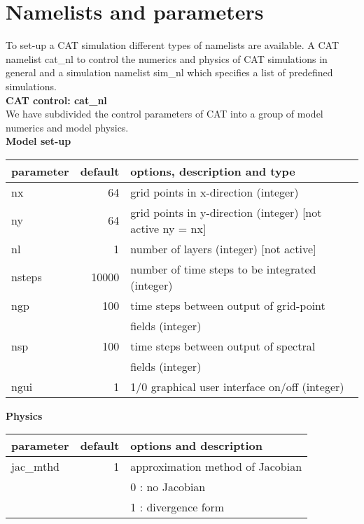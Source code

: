 \chapter{Namelists and parameters}
To set-up a CAT simulation different types of namelists are available. 
A CAT namelist cat{\_}nl to control the numerics and physics of CAT
simulations in general and a simulation namelist sim{\_}nl which specifies 
a list of predefined simulations.\\ 

\noindent
{\bf \Large CAT control: cat{\_}nl} \\
\noindent
We have subdivided the control parameters of CAT into a group of model
numerics and model physics. \\

\noindent
{\bf Model set-up} \\ 
\noindent
\begin{tabular}{|l|r|l|}
 \hline
 parameter & default & options, description and type \\
 \hline
 nx      &   64       & grid points in x-direction (integer) \\
 ny      &   64       & grid points in y-direction (integer) [not active ny = nx] \\
 nl      &   1        & number of layers (integer) [not active]  \\
 nsteps  &   10000    & number of time steps to be integrated (integer) \\
 ngp     &   100      & time steps between output of grid-point  \\
         &            & fields (integer) \\
 nsp     &   100      & time steps between output of spectral  \\
         &            & fields (integer) \\
 ngui    &   1        & 1/0 graphical user interface on/off (integer) \\
 \hline
\end{tabular} 

\vspace{0.5cm}

\noindent
{\bf Physics} \\ 
\noindent
\begin{tabular}{|l|r|l|}
 \hline
 parameter & default & options and description \\
 \hline
 jac{\_}mthd  &  1       & approximation method of Jacobian  \\
              &          & 0 : no Jacobian  \\
              &          & 1 : divergence form \\
 \hline
\end{tabular}

